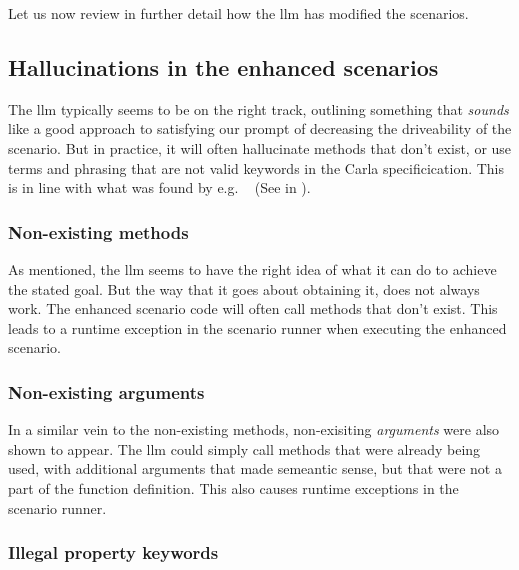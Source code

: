 Let us now review in further detail how the \acrshort{llm} has modified the scenarios.

\subsection{Hallucinations in the enhanced scenarios}

The \acrshort{llm} typically seems to be on the right track, outlining something
that \emph{sounds} like a good approach to satisfying our prompt of decreasing
the driveability of the scenario. But in practice, it will often hallucinate
methods that don't exist, or use terms and phrasing that are not valid keywords
in the Carla specificication. This is in line with what was found by e.g.
\citeauthor{autoSceneGen}~\cite[14542]{autoSceneGen} (See  in
).

\subsubsection{Non-existing methods}

As mentioned, the \acrshort{llm} seems to have the right idea of what it can do
to achieve the stated goal. But the way that it goes about obtaining it, does
not always work. The enhanced scenario code will often call methods that don't
exist. This leads to a runtime exception in the scenario runner when executing
the enhanced scenario.

\subsubsection{Non-existing arguments}

In a similar vein to the non-existing methods, non-exisiting \emph{arguments}
were also shown to appear. The \acrshort{llm} could simply call methods that
were already being used, with additional arguments that made semeantic sense,
but that were not a part of the function definition. This also causes runtime
exceptions in the scenario runner.

\subsubsection{Illegal property keywords}

